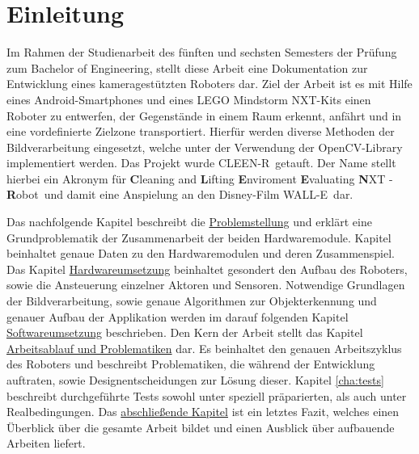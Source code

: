 \chapter{Einleitung}
\label{cha:einleitung}

Im Rahmen der Studienarbeit des fünften und sechsten Semesters der Prüfung zum Bachelor of Engineering, stellt diese Arbeit eine Dokumentation zur Entwicklung eines kameragestützten Roboters dar. Ziel der Arbeit ist es mit Hilfe eines Android-Smartphones und eines LEGO Mindstorm NXT-Kits einen Roboter zu entwerfen, der Gegenstände in einem Raum erkennt, anfährt und in eine vordefinierte Zielzone transportiert. Hierfür werden diverse Methoden der Bildverarbeitung eingesetzt, welche unter der Verwendung der OpenCV-Library \cite{opencv_library} implementiert werden. Das Projekt wurde \glqq CLEEN-R\grqq\ getauft. Der Name stellt hierbei ein Akronym für \glqq \textbf{C}leaning and \textbf{L}ifting \textbf{E}nviroment \textbf{E}valuating \textbf{N}XT - \textbf{R}obot\grqq\ und damit eine Anspielung an den Disney-Film \glqq WALL-E\grqq\ dar.

Das nachfolgende Kapitel beschreibt die \hyperref[cha:Problemstellung]{Problemstellung} und erklärt eine Grundproblematik der Zusammenarbeit der beiden Hardwaremodule. Kapitel  beinhaltet genaue Daten zu den Hardwaremodulen und deren Zusammenspiel. Das Kapitel \hyperref[cha:robot]{Hardwareumsetzung} beinhaltet gesondert den Aufbau des Roboters, sowie die Ansteuerung einzelner Aktoren und Sensoren. Notwendige Grundlagen der Bildverarbeitung, sowie genaue Algorithmen zur Objekterkennung und genauer Aufbau der Applikation werden im darauf folgenden Kapitel \hyperref[cha:Software]{Softwareumsetzung} beschrieben. Den Kern der Arbeit stellt das Kapitel \hyperref[cha:Workloop]{Arbeitsablauf und Problematiken} dar. Es beinhaltet den genauen Arbeitszyklus des Roboters und beschreibt Problematiken, die während der Entwicklung auftraten, sowie Designentscheidungen zur Lösung dieser. Kapitel \ref{cha:tests} beschreibt durchgeführte Tests sowohl unter speziell präparierten, als auch unter Realbedingungen. Das \hyperref[cha:Fazit]{abschließende Kapitel} ist ein letztes Fazit, welches einen Überblick über die gesamte Arbeit bildet und einen Ausblick über aufbauende Arbeiten liefert.



